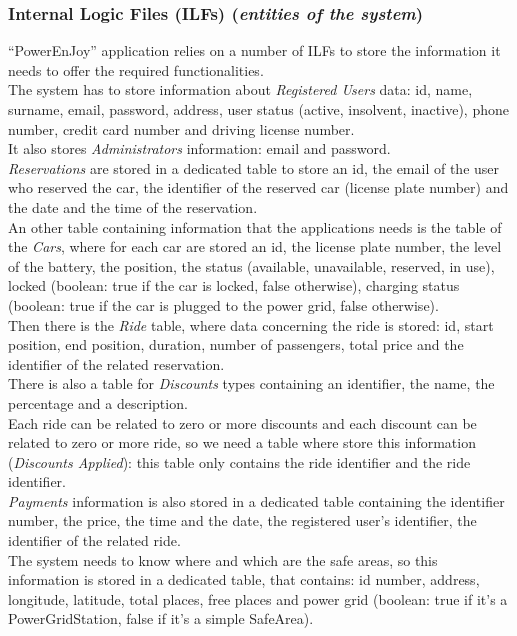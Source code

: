 \subsubsection{Internal Logic Files (ILFs) (\textit{entities of the system})}
``PowerEnJoy'' application relies on a number of ILFs to store the information it needs to offer the required functionalities. \\
The system has to store information about \textit{Registered Users} data: id, name, surname, email, password, address, user status (active, insolvent, inactive), phone number, credit card number and driving license number. \\
It also stores \textit{Administrators} information: email and password. \\
\textit{Reservations} are stored in a dedicated table to store an id, the email of the user who reserved the car, the identifier of the reserved car (license plate number) and the date and the time of the reservation. \\
An other table containing information that the applications needs is the table of the \textit{Cars}, where for each car are stored an id, the license plate number, the level of the battery, the position, the status (available, unavailable, reserved, in use), locked (boolean: true if the car is locked, false otherwise), charging status (boolean: true if the car is plugged to the power grid, false otherwise). \\
Then there is the \textit{Ride} table, where data concerning the ride is stored: id, start position, end position, duration, number of passengers, total price and the identifier of the related reservation. \\ 
There is also a table for \textit{Discounts} types containing an identifier, the name, the percentage and a description. \\ 
Each ride can be related to zero or more discounts and each discount can be related to zero or more ride, so we need a table where store this information (\textit{Discounts Applied}): this table only contains the ride identifier and the ride identifier. \\
\textit{Payments} information is also stored in a dedicated table containing the identifier number, the price, the time and the date, the registered user's identifier, the identifier of the related ride. \\
The system needs to know where and which are the safe areas, so this information is stored in a dedicated table, that contains: id number, address, longitude, latitude, total places, free places and power grid (boolean: true if it's a PowerGridStation, false if it's a simple SafeArea). \\

